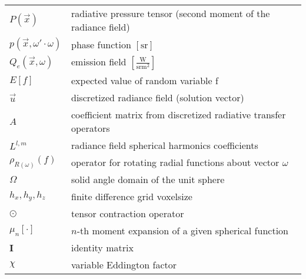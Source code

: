 \begin{flushleft}
\begin{longtable}[c]{@{}p{28.5mm}@{} p{120.5mm}}
	\\
	$P\left(\vec{x}\right)$	&  radiative pressure tensor (second moment of the radiance field)
	\\
	$p\left(\vec{x}, \omega'\cdot\omega\right)$	&  phase function $\left[\si{\steradian}\right]$
	\\
	$Q_e\left(\vec{x}, \omega\right)$	&  emission field $\left[\frac{\si{\watt}}{\si{\steradian} \si{\meter}^2}\right]$
	\\
	$E\left[f\right]$	&  expected value of random variable f
	\\
	$\vec{u}$	&  discretized radiance field (solution vector)
	\\
	$A$	&  coefficient matrix from discretized radiative transfer operators
	\\
	$L^{l,m}$	&  radiance field spherical harmonics coefficients
	\\
	$\rho_{R\left(\omega\right)}\left(f\right)$	&  operator for rotating radial functions about vector $\omega$
	\\
	$\Omega$	&  solid angle domain of the unit sphere
	\\
	$h_x, h_y, h_z$	&  finite difference grid voxelsize
	\\
	$\odot$	&  tensor contraction operator
	\\
	$\mu_n\left[\cdot\right]$	&  $n$-th moment expansion of a given spherical function
	\\
	$\mathbf{I}$	&  identity matrix
	\\
	$\chi$	&  variable Eddington factor
\end{longtable}
\end{flushleft}
%
%